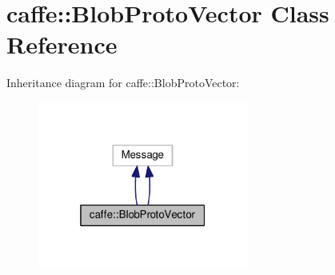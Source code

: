\hypertarget{classcaffe_1_1_blob_proto_vector}{}\section{caffe\+:\+:Blob\+Proto\+Vector Class Reference}
\label{classcaffe_1_1_blob_proto_vector}


Inheritance diagram for caffe\+:\+:Blob\+Proto\+Vector\+:
\nopagebreak
\begin{figure}[H]
\begin{center}
\leavevmode
\includegraphics[width=196pt]{classcaffe_1_1_blob_proto_vector__inherit__graph}
\end{center}
\end{figure}
